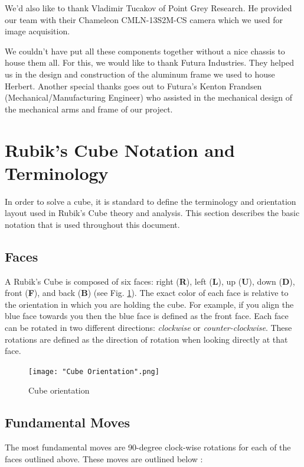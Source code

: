 \documentclass[final, letterpaper, 10 pt, conference, twocolumn]{IEEEtran}
\begin{document}
We'd also like to thank Vladimir Tucakov of Point Grey Research. He provided our team with their Chameleon CMLN-13S2M-CS camera which we used for image acquisition.

We couldn't have put all these components together without a nice chassis to house them all. For this, we would like to thank Futura Industries. They helped us in the design and construction of the aluminum frame we used to house Herbert. Another special thanks goes out to Futura's Kenton Frandsen (Mechanical/Manufacturing Engineer) who assisted in the mechanical design of the mechanical arms and frame of our project.

\printbibliography

\appendix
\section{Rubik's Cube Notation and Terminology}
\label{sec:Appendix A}
In order to solve a cube, it is standard to define the terminology and orientation layout used in Rubik's Cube theory and analysis. This section describes the basic notation that is used throughout this document.

\subsection{Faces}
A Rubik's Cube is composed of six faces: right (\textbf{R}), left (\textbf{L}), up (\textbf{U}), down (\textbf{D}), front (\textbf{F}), and back (\textbf{B}) (see Fig. \ref{fig:Cube Orientation}). The exact color of each face is relative to the orientation in which you are holding the cube. For example, if you align the blue face towards you then the blue face is defined as the front face. Each face can be rotated in two different directions: \textit{clockwise} or \textit{counter-clockwise}. These rotations are defined as the direction of rotation when looking directly at that face.

\begin{figure}[!hb]
\centering
\texttt{[image: "Cube Orientation".png]}
\caption{Cube orientation}
\label{fig:Cube Orientation}
\end{figure}

\subsection{Fundamental Moves}
\label{sec:fundamental moves}
The most fundamental moves are 90-degree clock-wise rotations for each of the faces outlined above. These moves are outlined below \cite{BasicCubeNotation}:
\end{document}
